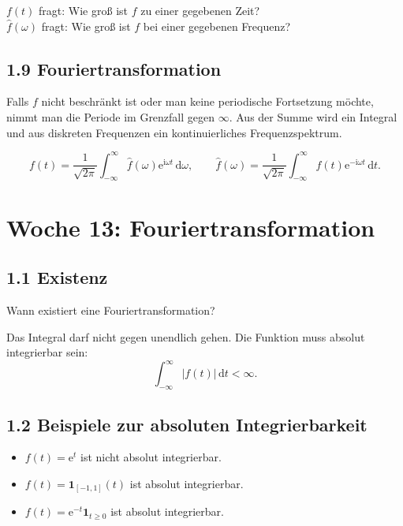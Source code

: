 \documentclass[11pt,a4paper]{article}
\newcommand{\ii}{\mathrm i}
\newcommand{\ee}{\mathrm e}
\newcommand{\dd}{\,\mathrm d}
\begin{document}
\begin{importantbox}
$f(t)$ fragt: Wie groß ist $f$ zu einer gegebenen Zeit? \\
$\widehat f(\omega)$ fragt: Wie groß ist $f$ bei einer gegebenen Frequenz?
\end{importantbox}

\subsection{1.9 Fouriertransformation}
Falls $f$ nicht beschränkt ist oder man keine periodische Fortsetzung möchte, nimmt man die Periode im Grenzfall gegen $\infty$. Aus der Summe wird ein Integral und aus diskreten Frequenzen ein kontinuierliches Frequenzspektrum.

\begin{importantbox}
\[
f(t)=\frac1{\sqrt{2\pi}}\int_{-\infty}^{\infty}\widehat f(\omega)\ee^{\ii\omega t}\dd\omega,
\qquad
\widehat f(\omega)=\frac1{\sqrt{2\pi}}\int_{-\infty}^{\infty}f(t)\ee^{-\ii\omega t}\dd t.
\]
\end{importantbox}

\section{Woche 13: Fouriertransformation}

\subsection{1.1 Existenz}
\begin{fragebox}
Wann existiert eine Fouriertransformation?
\end{fragebox}
\begin{antwortbox}
Das Integral darf nicht gegen unendlich gehen. Die Funktion muss absolut integrierbar sein:
\[
\int_{-\infty}^{\infty}|f(t)|\dd t<\infty.
\]
\end{antwortbox}

\subsection{1.2 Beispiele zur absoluten Integrierbarkeit}
\begin{beispielbox}
\begin{itemize}
\item $f(t)=\ee^t$ ist nicht absolut integrierbar.
\item $f(t)=\mathbf 1_{[-1,1]}(t)$ ist absolut integrierbar.
\item $f(t)=\ee^{-t}\mathbf 1_{t\ge0}$ ist absolut integrierbar.
\end{itemize}
\end{beispielbox}
\end{document}
